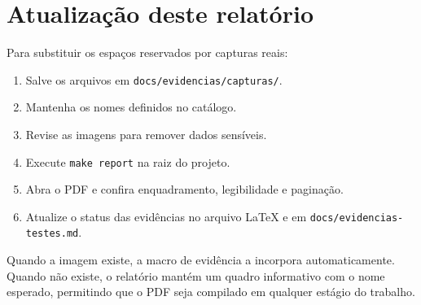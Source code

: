 \documentclass[12pt,a4paper,openany]{report}
\begin{document}
\chapter{Atualização deste relatório}

Para substituir os espaços reservados por capturas reais:

\begin{enumerate}
  \item Salve os arquivos em \texttt{docs/evidencias/capturas/}.
  \item Mantenha os nomes definidos no catálogo.
  \item Revise as imagens para remover dados sensíveis.
  \item Execute \texttt{make report} na raiz do projeto.
  \item Abra o PDF e confira enquadramento, legibilidade e paginação.
  \item Atualize o status das evidências no arquivo LaTeX e em \texttt{docs/evidencias-testes.md}.
\end{enumerate}

\begin{statusbox}
Quando a imagem existe, a macro de evidência a incorpora automaticamente. Quando não existe, o relatório mantém um quadro informativo com o nome esperado, permitindo que o PDF seja compilado em qualquer estágio do trabalho.
\end{statusbox}
\end{document}
